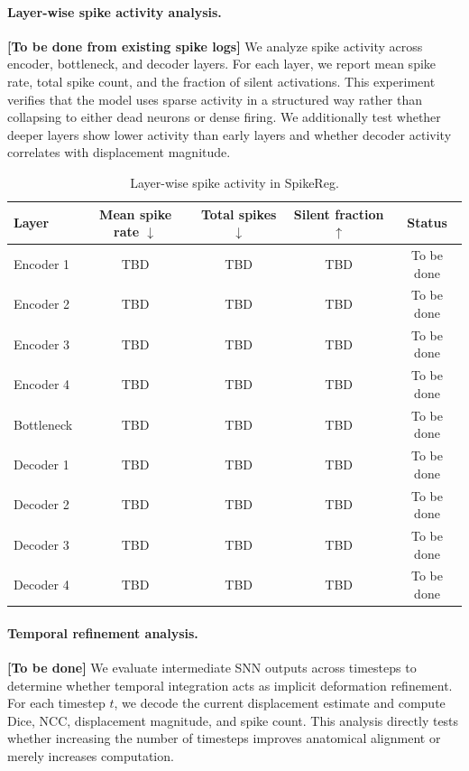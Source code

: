 \paragraph{Layer-wise spike activity analysis.}
\textbf{[To be done from existing spike logs]} We analyze spike activity across encoder, bottleneck, and decoder layers. For each layer, we report mean spike rate, total spike count, and the fraction of silent activations. This experiment verifies that the model uses sparse activity in a structured way rather than collapsing to either dead neurons or dense firing. We additionally test whether deeper layers show lower activity than early layers and whether decoder activity correlates with displacement magnitude.

\begin{table}[t]
\centering
\caption{Layer-wise spike activity in SpikeReg.}
\label{tab:layer_spike_activity}
\begin{tabular}{lcccc}
\toprule
Layer & Mean spike rate $\downarrow$ & Total spikes $\downarrow$ & Silent fraction $\uparrow$ & Status \\
\midrule
Encoder 1 & TBD & TBD & TBD & To be done \\
Encoder 2 & TBD & TBD & TBD & To be done \\
Encoder 3 & TBD & TBD & TBD & To be done \\
Encoder 4 & TBD & TBD & TBD & To be done \\
Bottleneck & TBD & TBD & TBD & To be done \\
Decoder 1 & TBD & TBD & TBD & To be done \\
Decoder 2 & TBD & TBD & TBD & To be done \\
Decoder 3 & TBD & TBD & TBD & To be done \\
Decoder 4 & TBD & TBD & TBD & To be done \\
\bottomrule
\end{tabular}
\end{table}

\paragraph{Temporal refinement analysis.}
\textbf{[To be done]} We evaluate intermediate SNN outputs across timesteps to determine whether temporal integration acts as implicit deformation refinement. For each timestep \(t\), we decode the current displacement estimate and compute Dice, NCC, displacement magnitude, and spike count. This analysis directly tests whether increasing the number of timesteps improves anatomical alignment or merely increases computation.

